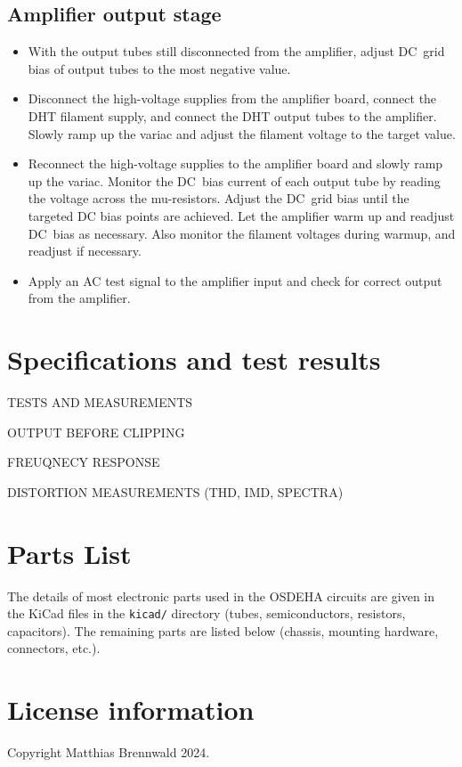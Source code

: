 \subsection{Amplifier output stage}
\begin{itemize}
\item With the output tubes still disconnected from the amplifier, adjust DC grid bias of output tubes to the most negative value.
\item Disconnect the high-voltage supplies from the amplifier board, connect the DHT filament supply, and connect the DHT output tubes to the amplifier. Slowly ramp up the variac and adjust the filament voltage to the target value.
\item Reconnect the high-voltage supplies to the amplifier board and slowly ramp up the variac. Monitor the DC bias current of each output tube by reading the voltage across the mu-resistors. Adjust the DC grid bias until the targeted DC bias points are achieved. Let the amplifier warm up and readjust DC bias as necessary. Also monitor the filament voltages during warmup, and readjust if necessary.
\item Apply an AC test signal to the amplifier input and check for correct output from the amplifier.
\end{itemize}



\section{Specifications and test results}

TESTS AND MEASUREMENTS

OUTPUT BEFORE CLIPPING

FREUQNECY RESPONSE

DISTORTION MEASUREMENTS (THD, IMD, SPECTRA)


\section{Parts List}

The details of most electronic parts used in the OSDEHA circuits are given in the KiCad files in the {\tt kicad/} directory (tubes, semiconductors, resistors, capacitors). The remaining parts are listed below (chassis, mounting hardware, connectors, etc.).

{\footnotesize {}}


\clearpage
\section{License information} 
Copyright Matthias Brennwald 2024.                                                    

